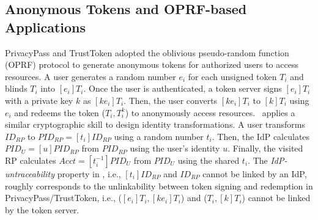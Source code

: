 \subsection{Anonymous Tokens and OPRF-based Applications}
\label{sec:related}

\newc
PrivacyPass and TrustToken \cite{privacypass,trusttoken}
adopted the oblivious pseudo-random function (OPRF) protocol \cite{oprf-proved,voprf-proved,oprf-bitcoin-wallet} to generate anonymous tokens for authorized users to access resources.
 A user generates a random number $e_i$ for each unsigned token $T_i$ and blinds $T_i$ into $[e_i]T_i$.
Once the user is authenticated, a token server signs $[e_i]T_i$ with a private key $k$ as $[k e_i]T_i$. Then, the user converts $[ke_i]T_i$ to $[k]T_i$ using $e_i$ and redeems the token ($T_i, T_i^k$) to anonymously access resources.
\usso\ applies a similar cryptographic skill to design identity transformations. A user transforms $ID_{RP}$ to $PID_{RP} = [t_i]ID_{RP}$ using a random number $t_i$.
Then, the IdP calculates $PID_U = [u]PID_{RP}$ %
from $PID_{RP}$ using the user's identity $u$.
Finally, the visited RP calculates $Acct = [t_i^{-1}]PID_{U}$ from $PID_{U}$ using the shared $t_i$.
The \emph{IdP-untraceability} property in \usso, i.e., $[t_i]ID_{RP}$ and $ID_{RP}$ cannot be linked by an IdP, roughly corresponds to
the unlinkability between token signing and redemption in PrivacyPass/TrustToken, i.e., ($[e_i]T_i, [ke_i]T_i$) and  ($T_i, [k]T_i$) cannot be linked by the token server.


